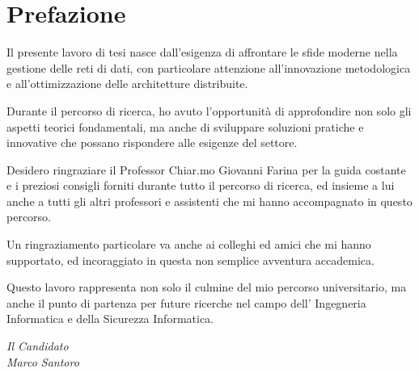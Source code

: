 \chapter*{Prefazione}

\begin{em} %

Il presente lavoro di tesi nasce dall'esigenza di affrontare le sfide moderne nella gestione delle reti di dati, 
con particolare attenzione all'innovazione metodologica e all'ottimizzazione delle architetture distribuite.

Durante il percorso di ricerca, ho avuto l'opportunità di approfondire non solo gli aspetti teorici fondamentali, ma anche di sviluppare soluzioni pratiche e innovative che possano rispondere alle esigenze del settore.

Desidero ringraziare il Professor Chiar.mo Giovanni Farina per la guida costante e i preziosi consigli forniti durante tutto il percorso di ricerca, ed insieme a lui anche a tutti gli altri professori e assistenti che mi hanno accompagnato in questo percorso.

Un ringraziamento particolare va anche ai colleghi ed amici che mi hanno supportato, ed incoraggiato in questa non semplice avventura accademica.

Questo lavoro rappresenta non solo il culmine del mio percorso universitario, ma anche il punto di partenza per future ricerche nel campo dell' Ingegneria Informatica e della Sicurezza Informatica.

\end{em}

\vspace{2cm}
\begin{flushright}
\textit{Il Candidato}\\
\textit{Marco Santoro}
\end{flushright}